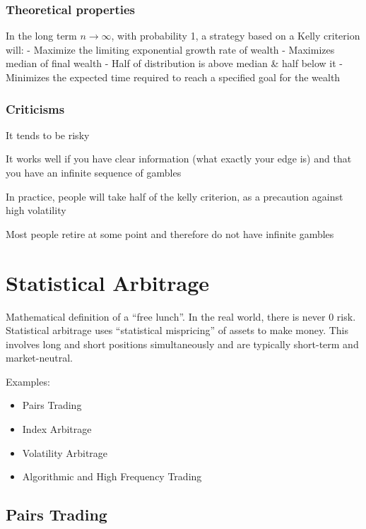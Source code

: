 \documentclass[
  oneside]{book}
\providecommand{\tightlist}{%
  \setlength{\itemsep}{0pt}\setlength{\parskip}{0pt}}
\begin{document}
\hypertarget{theoretical-properties}{%
\subsection{Theoretical properties}\label{theoretical-properties}}

In the long term \(n\to \infty\), with probability 1, a strategy based on a Kelly criterion will:
- Maximize the limiting exponential growth rate of wealth
- Maximizes median of final wealth
- Half of distribution is above median \& half below it
- Minimizes the expected time required to reach a specified goal for the wealth

\hypertarget{criticisms}{%
\subsection{Criticisms}\label{criticisms}}

It tends to be risky

It works well if you have clear information (what exactly your edge is) and that you have an infinite sequence of gambles

In practice, people will take half of the kelly criterion, as a precaution against high volatility

Most people retire at some point and therefore do not have infinite gambles

\hypertarget{statistical-arbitrage}{%
\chapter{Statistical Arbitrage}\label{statistical-arbitrage}}

Mathematical definition of a ``free lunch''. In the real world, there is never 0 risk. Statistical arbitrage uses ``statistical mispricing'' of assets to make money. This involves long and short positions simultaneously and are typically short-term and market-neutral.

Examples:

\begin{itemize}
\tightlist
\item
  Pairs Trading
\item
  Index Arbitrage
\item
  Volatility Arbitrage
\item
  Algorithmic and High Frequency Trading
\end{itemize}

\hypertarget{pairs-trading}{%
\section{Pairs Trading}\label{pairs-trading}}
\end{document}
